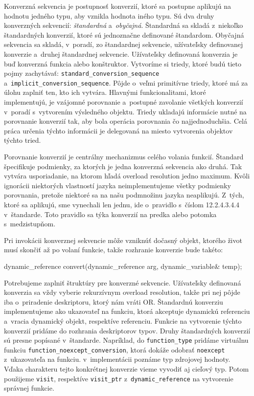 Konverzná sekvencia je postupnosť konverzií, ktoré sa postupne aplikujú na hodnotu jedného typu, aby vznikla hodnota iného typu. Sú dva druhy konverzných sekvencií: \emph{štandardná} a~\emph{obyčajná}. Štandardná sa skladá z~niekoľko štandardných konverzií, ktoré sú jednoznačne definované štandardom. Obyčajná sekvencia sa skladá, v~poradí, zo štandardnej sekvencie, užívateľsky definovanej konverzie a~druhej štandardnej sekvencie. Užívateľsky definovaná konverzia je buď konverzná funkcia alebo konštruktor. Vytvoríme si triedy, ktoré budú tieto pojmy za\-chy\-tá\-vať: \texttt{standard\_conversion\_sequence} a~\texttt{implicit\_conversion\_sequence}. Pôjde o~veľmi primitívne triedy, ktoré má za úlohu zaplniť ten, kto ich vytvára. Hlavnými funkcionalitami, ktoré implementujú, je vzájomné porovnanie a~postupné zavolanie všetkých konverzií v~poradí s~vytvorením výsledného objektu. Triedy ukladajú informácie nutné na porovnanie konverzií tak, aby bola operácia porovnania čo najjednoduchšia. Celá práca určenia týchto informácii je delegovaná na miesto vytvorenia objektov týchto tried.

Porovnanie konverzií je centrálny mechanizmus celého volania funkcií. Štandard špecifikuje podmienky, za ktorých je jedna konverzná sekvencia  ako druhá. Tak vytvára usporiadanie, na ktorom hľadá overload resolution jedno maximum. Kvôli ignorácii niektorých vlastností jazyka neimplementujeme všetky podmienky porovnania, pretože niektoré sa na našu podmnožinu jazyka neaplikujú. Z~tých, ktoré sa aplikujú, sme vynechali len jednu, ide o~pravidlo s~číslom 12.2.4.3.4.4 v~štandarde. Toto pravidlo sa týka konverzií na predka alebo potomka s~medzistupňom.

Pri invokácii konverznej sekvencie môže vzniknúť dočasný objekt, ktorého život musí skončiť až po volaní funkcie, takže rozhranie konverzie bude takéto:
\begin{code}[fontsize=\footnotesize]
dynamic_reference convert(dynamic_reference arg, dynamic_variable& temp);
\end{code}

Potrebujeme zaplniť štruktúry pre konverzné sekvencie. Užívateľsky definovaná konverzia sa vždy vyberie rekurzívnym overload resolution, takže pri nej pôjde iba o~priradenie deskriptoru, ktorý nám vráti OR. Štandardnú konverziu implementujeme ako ukazovateľ na funkciu, ktorá akceptuje dynamickú referenciu a~vracia dynamický objekt, respektíve referenciu. Funkcie na vytvorenie týchto konverzií pridáme do rozhrania deskriptorov typov. Druhy štandardných konverzií sú presne popísané v~štandarde. Napríklad, do \texttt{function\_type} pridáme virtuálnu funkciu \texttt{function\_noexcept\_conversion}, ktorá dokáže odobrať \texttt{noexcept} z~ukazovateľa na funkciu.  v~implementácii poznáme typ zdrojovej hodnoty. Vďaka charakteru tejto konkrétnej konverzie vieme vyvodiť aj cieľový typ. Potom použijeme \texttt{visit}, respektíve \texttt{visit\_ptr} z~\texttt{dynamic\_reference} na vytvorenie správnej funkcie.


